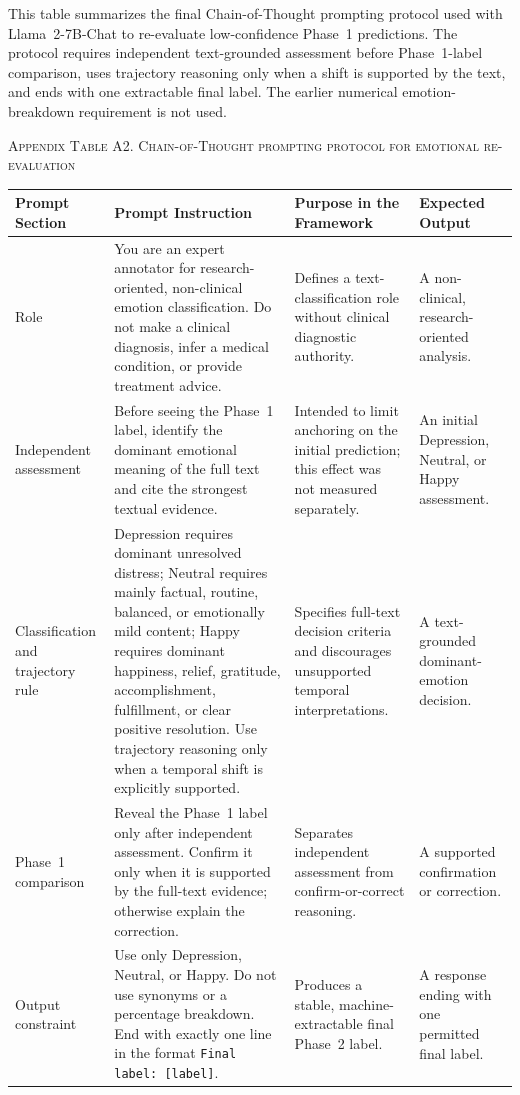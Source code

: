 \documentclass{ieeeaccess}
\begin{document}
This table summarizes the final Chain-of-Thought prompting protocol used with Llama~2-7B-Chat to re-evaluate low-confidence Phase~1 predictions. The protocol requires independent text-grounded assessment before Phase~1-label comparison, uses trajectory reasoning only when a shift is supported by the text, and ends with one extractable final label. The earlier numerical emotion-breakdown requirement is not used.

\par\medskip
\noindent\textsc{Appendix Table A2. Chain-of-Thought prompting protocol for emotional re-evaluation}\par
\label{tab:appendix-a2-cot-prompt}
\smallskip
\small
\setlength{\tabcolsep}{3.5pt}
\renewcommand{\arraystretch}{1.2}
\noindent\begin{tabularx}{\textwidth}{@{}>{\raggedright\arraybackslash}p{}YYY@{}}
\toprule
Prompt Section & Prompt Instruction & Purpose in the Framework & Expected Output \\
\midrule
Role & You are an expert annotator for research-oriented, non-clinical emotion classification. Do not make a clinical diagnosis, infer a medical condition, or provide treatment advice. & Defines a text-classification role without clinical diagnostic authority. & A non-clinical, research-oriented analysis. \\
Independent assessment & Before seeing the Phase~1 label, identify the dominant emotional meaning of the full text and cite the strongest textual evidence. & Intended to limit anchoring on the initial prediction; this effect was not measured separately. & An initial Depression, Neutral, or Happy assessment. \\
Classification and trajectory rule & Depression requires dominant unresolved distress; Neutral requires mainly factual, routine, balanced, or emotionally mild content; Happy requires dominant happiness, relief, gratitude, accomplishment, fulfillment, or clear positive resolution. Use trajectory reasoning only when a temporal shift is explicitly supported. & Specifies full-text decision criteria and discourages unsupported temporal interpretations. & A text-grounded dominant-emotion decision. \\
Phase~1 comparison & Reveal the Phase~1 label only after independent assessment. Confirm it only when it is supported by the full-text evidence; otherwise explain the correction. & Separates independent assessment from confirm-or-correct reasoning. & A supported confirmation or correction. \\
Output constraint & Use only Depression, Neutral, or Happy. Do not use synonyms or a percentage breakdown. End with exactly one line in the format \texttt{Final label: [label]}. & Produces a stable, machine-extractable final Phase~2 label. & A response ending with one permitted final label. \\
\bottomrule
\end{tabularx}
\par\medskip
\end{document}
